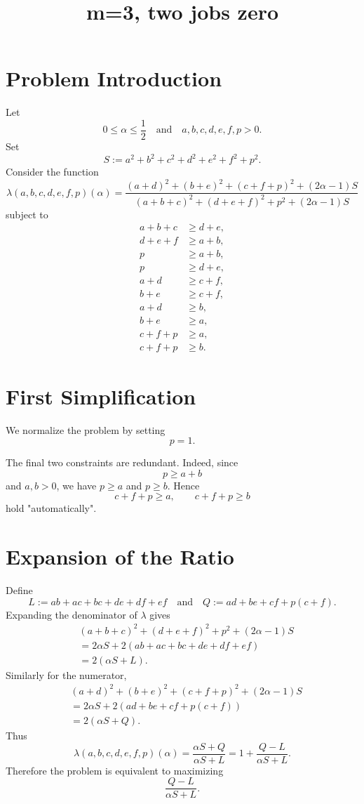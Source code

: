 \documentclass[11pt]{article}
\begin{document}
\title{m=3, two jobs zero}
\author{}
\date{}
\maketitle

\section{Problem Introduction}

Let
\[
0\le \alpha\le \frac12 \quad\text{and}\quad
a,b,c,d,e,f,p>0.
\]
Set
\[
S:=a^2+b^2+c^2+d^2+e^2+f^2+p^2.
\]
Consider the function
\[
\lambda(a,b,c,d,e,f,p)(\alpha)
=
\frac{
(a+d)^2+(b+e)^2+(c+f+p)^2+(2\alpha-1)S
}{
(a+b+c)^2+(d+e+f)^2+p^2+(2\alpha-1)S
}
\]
subject to
\[
\begin{aligned}
a+b+c&\ge d+e,\\
d+e+f&\ge a+b,\\
p&\ge a+b,\\
p&\ge d+e,\\
a+d&\ge c+f,\\
b+e&\ge c+f,\\
a+d&\ge b,\\
b+e&\ge a,\\
c+f+p&\ge a,\\
c+f+p&\ge b.
\end{aligned}
\]


\section{First Simplification}

We normalize the problem by setting
\[p=1.
\]

The final two constraints are redundant. Indeed, since
\[
p\ge a+b
\]
and \(a,b>0\), we have \(p\ge a\) and \(p\ge b\). Hence
\[
c+f+p\ge a,\qquad c+f+p\ge b
\]
hold "automatically".

\section{Expansion of the Ratio}

Define
\[
L:=ab+ac+bc+de+df+ef
\quad \text{and}\quad
Q:=ad+be+cf+p(c+f).
\]
Expanding the denominator of $\lambda$ gives
\[
\begin{aligned}
& (a+b+c)^2+(d+e+f)^2+p^2+(2\alpha-1)S\\
&=
2\alpha S+2(ab+ac+bc+de+df+ef)\\
&=
2(\alpha S+L).
\end{aligned}
\]
Similarly for the numerator,
\[
\begin{aligned}
& (a+d)^2+(b+e)^2+(c+f+p)^2+(2\alpha-1)S\\
&=
2\alpha S+2(ad+be+cf+p(c+f))\\
&=
2(\alpha S+Q).
\end{aligned}
\]
Thus
\[
\lambda(a,b,c,d,e,f,p)(\alpha)
=
\frac{\alpha S+Q}{\alpha S+L}
=
1+\frac{Q-L}{\alpha S+L}.
\]
Therefore the problem is equivalent to maximizing
\[
\frac{Q-L}{\alpha S+L}.
\]
\end{document}
